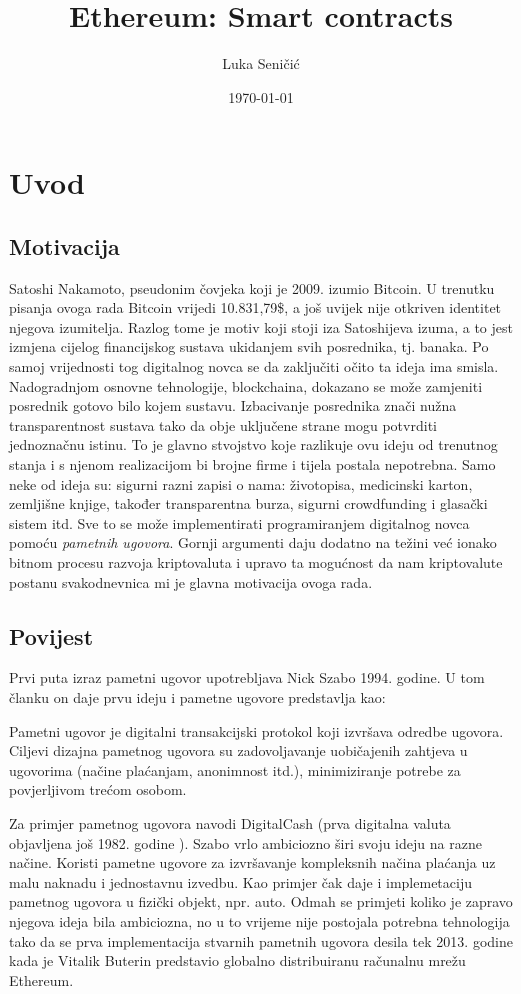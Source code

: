 \documentclass[12pt]{report}
\title{Ethereum: Smart contracts}
\author{Luka Seničić}
\date{\today}
\begin{document}
\maketitle

\tableofcontents

\chapter{Uvod}
\section{Motivacija}

Satoshi Nakamoto, pseudonim čovjeka koji je 2009. izumio Bitcoin. U trenutku pisanja ovoga rada Bitcoin vrijedi 10.831,79\$, a još uvijek nije otkriven identitet njegova izumitelja. Razlog tome je motiv koji stoji iza Satoshijeva izuma, a to jest izmjena cijelog financijskog sustava ukidanjem svih posrednika, tj. banaka. Po samoj vrijednosti tog digitalnog novca se da zaključiti očito ta ideja ima smisla. Nadogradnjom osnovne tehnologije, blockchaina, dokazano se može zamjeniti posrednik gotovo bilo kojem sustavu. Izbacivanje posrednika znači nužna transparentnost sustava tako da obje uključene strane mogu potvrditi jednoznačnu istinu. To je glavno stvojstvo koje razlikuje ovu ideju od trenutnog stanja i s njenom realizacijom bi brojne firme i tijela postala nepotrebna. Samo neke od ideja su: sigurni razni zapisi o nama: životopisa, medicinski karton, zemljišne knjige, također transparentna burza, sigurni crowdfunding i glasački sistem itd. Sve to se može implementirati programiranjem digitalnog novca pomoću \emph{pametnih ugovora}. Gornji argumenti daju dodatno na težini već ionako bitnom procesu razvoja kriptovaluta i upravo ta mogućnost da nam kriptovalute postanu svakodnevnica mi je glavna motivacija ovoga rada. 

\section{Povijest}

Prvi puta izraz pametni ugovor upotrebljava Nick Szabo 1994. godine\cite{smart_contract_idea}. U tom članku on daje prvu ideju i pametne ugovore predstavlja kao:
\begin{definicija}
Pametni ugovor je digitalni transakcijski protokol koji izvršava odredbe ugovora. Ciljevi dizajna pametnog ugovora su zadovoljavanje uobičajenih zahtjeva u ugovorima (načine plaćanjam, anonimnost itd.), minimiziranje potrebe za povjerljivom trećom osobom.
\end{definicija}
Za primjer pametnog ugovora navodi DigitalCash (prva digitalna valuta objavljena još 1982. godine \cite{digi_cash}). Szabo vrlo ambiciozno širi svoju ideju na razne načine. Koristi pametne ugovore za izvršavanje kompleksnih načina plaćanja uz malu naknadu i jednostavnu izvedbu. Kao primjer čak daje i implemetaciju pametnog ugovora u fizički objekt, npr. auto. Odmah se primjeti koliko je zapravo njegova ideja bila ambiciozna, no u to vrijeme nije postojala potrebna tehnologija tako da se prva implementacija stvarnih pametnih ugovora desila tek 2013. godine kada je Vitalik Buterin predstavio globalno distribuiranu računalnu mrežu Ethereum.
\end{document}
